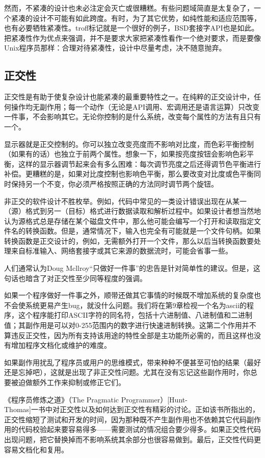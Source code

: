 \documentclass[12pt,oneside]{book}
\begin{document}
\begin{common-format}
然而，不紧凑的设计也未必注定会灭亡或很糟糕。有些问题域简直是太复杂了，一个紧凑的设计不可能有如此跨度。有时，为了其它优势，如纯性能和适应范围等，也有必要牺牲紧凑性。troff标记就是一个很好的例子，BSD套接字API也是如此。把紧凑性作为优点来强调，并不是要求大家把紧凑性看作一个绝对要求，而是要像Unix程序员那样：合理对待紧凑性，设计中尽量考虑，决不随意抛弃。

\subsection{正交性}
正交性是有助于使复杂设计也能紧凑的最重要特性之一。在纯粹的正交设计中，任何操作均无副作用；每一个动作（无论是API调用、宏调用还是语言运算）只改变一件事，不会影响其它。无论你控制的是什么系统，改变每个属性的方法有且只有一个。

显示器就是正交控制的。你可以独立改变亮度而不影响对比度，而色彩平衡控制（如果有的话）也独立于前两个属性。想象一下，如果按亮度按钮会影响色彩平衡，这样的显示器调节起来会有多么困难：每次调节亮度之后还得调节色平衡进行补偿。更糟糕的是，如果对比度控制也影响色平衡，那么要改变对比度或色平衡同时保持另一个不变，你必须严格按照正确的方法同时调节两个旋钮。

非正交的软件设计不胜枚举。例如，代码中常见的一类设计错误出现在从某一（源）格式到另一（目标）格式进行数据读取和解析过程中。如果设计者想当然地认为源格式总是存储在某个磁盘文件中，那么他可能会编写一个打开和读取指定文件名的转换函数。但是，通常情况下，输入也完全有可能就是一个文件句柄。如果转换函数是正交设计的，例如，无需额外打开一个文件，那么以后当转换函数要处理来自标准输入、网络套接字或其它来源的数据流时，可能会省事一些。

人们通常认为Doug Mcllroy“只做好一件事”的忠告是针对简单性的建议。但是，这句话也暗含了对正交性至少同等程度的强调。

如果一个程序做好一件事之外，顺带还做其它事情的时候既不增加系统的复杂度也不会使系统更易产生bug，就没什么问题。我们将在第9章检视一个名为ascii的程序，这个程序能打印ASCII字符的同名符，包括十六进制值、八进制值和二进制值；其副作用是可以对0-255范围内的数字进行快速进制转换。这第二个作用并不算违反正交性，因为所有支持该用途的特性全部是主功能所必需的，而且这样也没有增加程序文档化或维护的难度。

如果副作用扰乱了程序员或用户的思维模式，带来种种不便甚至可怕的结果（最好还是忘掉吧），这就是出现了非正交性问题。尤其在没有忘记这些副作用时，你总要被迫做额外工作来抑制或修正它们。

《程序员修炼之道》（The Pragmatic Programmer）[Hunt-\\Thomas]一书中对正交性以及如何达到正交性有精彩的讨论。正如该书所指出的，正交性缩短了测试和开发的时间，因为那种既不产生副作用也不依赖其它代码副作用的代码校验起来要容易得多——需要测试的情况组合要少得多。如果正交性代码出现问题，把它替换掉而不影响系统其余部分也很容易做到。最后，正交性代码更容易文档化和复用。


\end{common-format}
\end{document}
